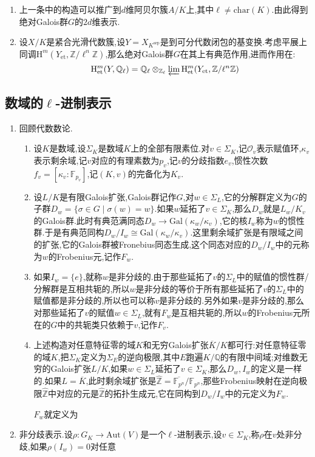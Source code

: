\begin{enumerate}
\begin{enumerate}[(1)]
		\item 上一条中的构造可以推广到$d$维阿贝尔簇$A/K$上,其中$\ell\not=\mathrm{char}(K)$.由此得到绝对Galois群$G$的$2d$维表示.
		\item 设$X/K$是紧合光滑代数簇,设$Y=X_{K^{\mathrm{sep}}}$是到可分代数闭包的基变换.考虑平展上同调$\mathrm{H}^m(Y_{\mathrm{et}},\mathbb{Z}/\ell^n\mathbb{Z})$,那么绝对Galois群$G$在其上有典范作用,进而作用在:
		$$\mathrm{H}^m_{\mathrm{et}}(Y,\mathbb{Q}_{\ell})=\mathbb{Q}_{\ell}\otimes_{\mathbb{Z}_{\ell}}\varprojlim\mathrm{H}^m_{\mathrm{et}}(Y_{\mathrm{et}},\mathbb{Z}/\ell^n\mathbb{Z})$$
	\end{enumerate}
\end{enumerate}
\subsection{数域的$\ell$-进制表示}
\begin{enumerate}
	\item 回顾代数数论.
	\begin{enumerate}[(1)]
		\item 设$K$是数域,设$\Sigma_K$是数域$K$上的全部有限素位.对$v\in\Sigma_K$,记$\mathscr{O}_v$表示赋值环,$\kappa_v$表示剩余域,记$v$对应的有理素数为$p_v$,记$v$的分歧指数$e_v$,惯性次数$f_v=[\kappa_v:\mathbb{F}_{p_v}]$,记$(K,v)$的完备化为$K_v$.
		\item 设$L/K$是有限Galois扩张,Galois群记作$G$,对$w\in\Sigma_L$,它的分解群定义为$G$的子群$D_w=\{\sigma\in G\mid\sigma(w)=w\}$.如果$w$延拓了$v\in\Sigma_K$,那么$D_w$就是$L_w/K_v$的Galois群.此时有典范满同态$D_w\to\mathrm{Gal}(\kappa_w/\kappa_v)$,它的核$I_w$称为$w$的惯性群.于是有典范同构$D_w/I_w\cong\mathrm{Gal}(\kappa_w/\kappa_v)$.这里剩余域扩张是有限域之间的扩张,它的Galois群被Fronebius同态生成,这个同态对应的$D_w/I_w$中的元称为$w$的Frobenius元,记作$F_w$.
		\item 如果$I_w=\{e\}$,就称$w$是非分歧的.由于那些延拓了$v$的$\Sigma_L$中的赋值的惯性群/分解群是互相共轭的,所以$w$是非分歧的等价于所有那些延拓了$v$的$\Sigma_L$中的赋值都是非分歧的,所以也可以称$v$是非分歧的.另外如果$v$是非分歧的,那么对那些延拓了$v$的赋值$w\in\Sigma_L$,就有$F_w$是互相共轭的,所以$w$的Frobenius元所在的$G$中的共轭类只依赖于$v$,记作$F_v$.
		\item 上述构造对任意特征零的域$K$和无穷Galois扩张$\overline{K}/K$都可行:对任意特征零的域$K$,把$\Sigma_K$定义为$\Sigma_E$的逆向极限,其中$E$跑遍$K/\mathbb{Q}$的有限中间域;对维数无穷的Galois扩张$L/K$,如果$w\in\Sigma_L$延拓了$v\in\Sigma_K$,那么$D_w,I_w$的定义是一样的.如果$L=\overline{K}$,此时剩余域扩张是$\widehat{\mathbb{Z}}=\overline{\mathbb{F}_{p^n}}/\mathbb{F}_{p^n}$,那些Frobenius映射在逆向极限$\widehat{\mathbb{Z}}$中对应的元是$\widehat{\mathbb{Z}}$的拓扑生成元,它在同构到$D_w/I_w$中的元定义为$F_w$.
		
		
		$F_w$就定义为
	\end{enumerate}
	\item 非分歧表示.设$\rho:G_K\to\mathrm{Aut}(V)$是一个$\ell$-进制表示,设$v\in\Sigma_K$,称$\rho$在$v$处非分歧,如果$\rho(I_w)=0$对任意
\end{enumerate}





